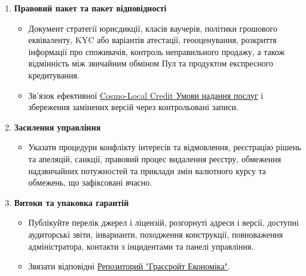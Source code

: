 \documentclass[11pt]{article}
\begin{document}
\begin{enumerate}[leftmargin=*]
\begin{itemize}[leftmargin=*]
\end{itemize}
\item \textbf{Правовий пакет та пакет відповідності}
\begin{itemize}[leftmargin=*]
\item Документ стратегії юрисдикції, класів ваучерів, політики грошового еквіваленту, KYC або варіантів атестації, геооценування, розкриття інформації про споживачів, контроль неправильного продажу, а також відмінність між звичайним обміном Пул та продуктом експресного кредитування.
\item Зв'язок ефективної \href{https://docs.cosmolocal.credit/uk/governance/terms}{Cosmo-Local Credit Умови надання послуг} і збереження замінених версій через контрольовані записи.
\end{itemize}
\item \textbf{Засилення управління}
\begin{itemize}[leftmargin=*]
\item Указати процедури конфлікту інтересів та відмовлення, реєстрацію рішень та апеляцій, санкції, правовий процес видалення реєстру, обмеження надзвичайних потужностей та приклади змін валютного курсу та обмежень, що зафіксовані вчасно.
\end{itemize}
\item \textbf{Витоки та упаковка гарантій}
\begin{itemize}[leftmargin=*]
\item Публікуйте перелік джерел і ліцензій, розгорнуті адреси і версії, доступні аудиторські звіти, інварианти, походження конструкції, повноваження адміністратора, контакти з інцидентами та панелі управління.
\item Звязати відповідні \href{https://github.com/grassrootseconomics}{Репозиторий "Грассройт Економіка"}.
\end{itemize}
\end{enumerate}
\end{document}
